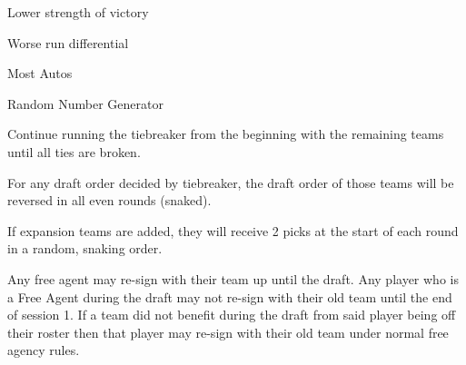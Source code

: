 \begin{deepEnumerate}
\begin{deepEnumerate}
\begin{deepEnumerate}
\begin{deepEnumerate}
				\item Lower strength of victory
				\item Worse run differential
				\item Most Autos
				\item Random Number Generator
			\end{deepEnumerate}
		\end{deepEnumerate}
		\item Continue running the tiebreaker from the beginning with the remaining teams until all ties are broken.
		\item For any draft order decided by tiebreaker, the draft order of those teams will be reversed in all even rounds (snaked).
		\item If expansion teams are added, they will receive 2 picks at the start of each round in a random, snaking order.
	\end{deepEnumerate}
	\item Any free agent may re-sign with their team up until the draft. Any player who is a Free Agent during the draft may
	 not re-sign with their old team until the end of session 1. If a team did not benefit during the draft from said player being
	 off their roster then that player may re-sign with their old team under normal free agency rules. 
\end{deepEnumerate}